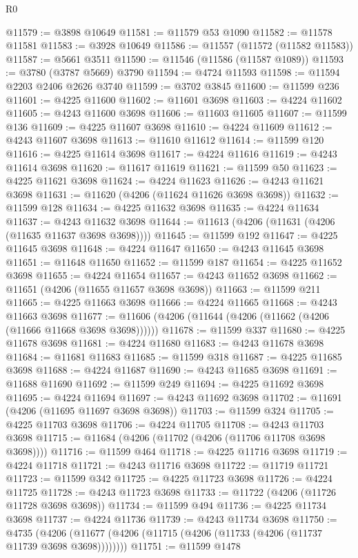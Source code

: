 \begin{lexlean}{R0}
\begin{coremodule}
@11579 := @3898 @10649
@11581 := @11579 @53 @1090
@11582 := @11578 @11581
@11583 := @3928 @10649
@11586 := @11557 (@11572 (@11582 @11583))
@11587 := @5661 @3511
@11590 := @11546 (@11586 (@11587 @1089))
@11593 := @3780 (@3787 @5669) @3790
@11594 := @4724 @11593
@11598 := @11594 @2203 @2406 @2626 @3740
@11599 := @3702 @3845
@11600 := @11599 @236
@11601 := @4225 @11600
@11602 := @11601 @3698
@11603 := @4224 @11602
@11605 := @4243 @11600 @3698
@11606 := @11603 @11605
@11607 := @11599 @136
@11609 := @4225 @11607 @3698
@11610 := @4224 @11609
@11612 := @4243 @11607 @3698
@11613 := @11610 @11612
@11614 := @11599 @120
@11616 := @4225 @11614 @3698
@11617 := @4224 @11616
@11619 := @4243 @11614 @3698
@11620 := @11617 @11619
@11621 := @11599 @50
@11623 := @4225 @11621 @3698
@11624 := @4224 @11623
@11626 := @4243 @11621 @3698
@11631 := @11620 (@4206 (@11624 @11626 @3698 @3698))
@11632 := @11599 @128
@11634 := @4225 @11632 @3698
@11635 := @4224 @11634
@11637 := @4243 @11632 @3698
@11644 := @11613 (@4206 (@11631 (@4206 (@11635 @11637 @3698 @3698))))
@11645 := @11599 @192
@11647 := @4225 @11645 @3698
@11648 := @4224 @11647
@11650 := @4243 @11645 @3698
@11651 := @11648 @11650
@11652 := @11599 @187
@11654 := @4225 @11652 @3698
@11655 := @4224 @11654
@11657 := @4243 @11652 @3698
@11662 := @11651 (@4206 (@11655 @11657 @3698 @3698))
@11663 := @11599 @211
@11665 := @4225 @11663 @3698
@11666 := @4224 @11665
@11668 := @4243 @11663 @3698
@11677 := @11606 (@4206 (@11644 (@4206 (@11662 (@4206 (@11666 @11668 @3698 @3698))))))
@11678 := @11599 @337
@11680 := @4225 @11678 @3698
@11681 := @4224 @11680
@11683 := @4243 @11678 @3698
@11684 := @11681 @11683
@11685 := @11599 @318
@11687 := @4225 @11685 @3698
@11688 := @4224 @11687
@11690 := @4243 @11685 @3698
@11691 := @11688 @11690
@11692 := @11599 @249
@11694 := @4225 @11692 @3698
@11695 := @4224 @11694
@11697 := @4243 @11692 @3698
@11702 := @11691 (@4206 (@11695 @11697 @3698 @3698))
@11703 := @11599 @324
@11705 := @4225 @11703 @3698
@11706 := @4224 @11705
@11708 := @4243 @11703 @3698
@11715 := @11684 (@4206 (@11702 (@4206 (@11706 @11708 @3698 @3698))))
@11716 := @11599 @464
@11718 := @4225 @11716 @3698
@11719 := @4224 @11718
@11721 := @4243 @11716 @3698
@11722 := @11719 @11721
@11723 := @11599 @342
@11725 := @4225 @11723 @3698
@11726 := @4224 @11725
@11728 := @4243 @11723 @3698
@11733 := @11722 (@4206 (@11726 @11728 @3698 @3698))
@11734 := @11599 @494
@11736 := @4225 @11734 @3698
@11737 := @4224 @11736
@11739 := @4243 @11734 @3698
@11750 := @4735
    (@4206 (@11677 (@4206 (@11715 (@4206 (@11733 (@4206 (@11737 @11739 @3698 @3698))))))))
@11751 := @11599 @1478

\end{coremodule}
\end{lexlean}
